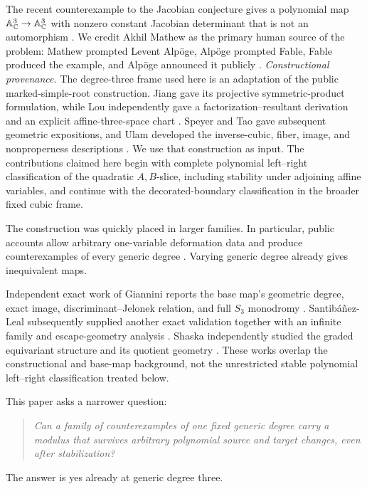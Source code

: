 \documentclass[11pt,reqno]{amsart}
\begin{document}
The recent counterexample to the Jacobian conjecture gives a polynomial
map \(\mathbb A^3_\mathbb C\to\mathbb A^3_\mathbb C\) with nonzero constant Jacobian determinant that
is not an automorphism \cite{alpoge2026announcement,tao2026digestion}.
We credit Akhil Mathew as the primary human source of the problem: Mathew
prompted Levent Alp\"oge, Alp\"oge prompted Fable, Fable produced the
example, and Alp\"oge announced it publicly
\cite{ulam2026counterexample}.
\emph{Constructional provenance.}  The degree-three frame used here is an
adaptation of the public marked-simple-root construction.  Jiang gave its
projective symmetric-product formulation, while Lou independently gave a
factorization--resultant derivation and an explicit affine-three-space chart
\cite{jiang2026markedroot,lou2026derivation}.  Speyer and Tao gave subsequent
geometric expositions, and Ulam developed the inverse-cubic, fiber, image, and
nonproperness descriptions
\cite{speyer2026seminar,tao2026digestion,ulam2026counterexample}.  We use that
construction as input.  The contributions claimed here begin with complete
polynomial left--right classification of the quadratic \(A,B\)-slice,
including stability under adjoining affine variables, and continue with the
decorated-boundary classification in the broader fixed cubic frame.

The construction was quickly placed in larger families.  In particular,
public accounts allow arbitrary one-variable deformation data and produce
counterexamples of every generic degree
\cite{ulam2026counterexample,gallagher2026explained}.  Varying generic
degree already gives inequivalent maps.

Independent exact work of Giannini reports the base map's geometric degree,
exact image, discriminant--Jelonek relation, and full \(S_3\) monodromy
\cite{giannini2026counterexample}.  Santib\'a\~nez-Leal subsequently supplied
another exact validation together with an infinite family and escape-geometry
analysis \cite{santibanezLeal2026validated}.  Shaska independently studied the
graded equivariant structure and its quotient geometry
\cite{shaska2026graded}.  These works overlap the constructional and
base-map background, not the unrestricted stable polynomial left--right
classification treated below.

This paper asks a narrower question:
\begin{quote}
\emph{Can a family of counterexamples of one fixed generic degree carry a
modulus that survives arbitrary polynomial source and target changes, even
after stabilization?}
\end{quote}
The answer is yes already at generic degree three.
\end{document}
